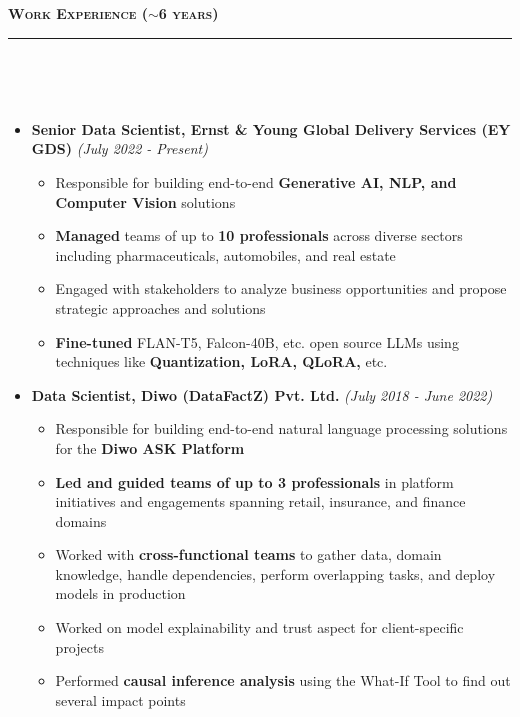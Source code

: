 \documentclass[a4paper,10pt]{article}
\newcommand{\isep}{-2 pt}
\newcommand{\lsep}{-0.5cm}
\newcommand{\resheading}[1]{{\small
        {
            \begin{minipage}
                {0.992\textwidth}\textbf{{\textsc{#1 \vphantom{p\^{E}} }}}
                \\[-0.3cm]
                \hrule
            \end{minipage}
            \\[-0.5cm]
        }
 }}
\begin{document}
\vspace{4pt}
\noindent
\resheading{\textbf{\large Work Experience ($\sim$6 years)}}\\[\lsep]
\vspace{4pt}
\begin{itemize}
    \item \textbf{Senior Data Scientist, Ernst \& Young Global Delivery Services (EY GDS)} \hfill {\emph{(July 2022 - Present)}}
    \\ [-0.6cm]
    \begin{itemize}\itemsep \isep
        \item Responsible for building end-to-end \textbf{Generative AI, NLP, and Computer Vision} solutions
        \item \textbf{Managed} teams of up to \textbf{10 professionals} across diverse sectors including pharmaceuticals, automobiles, and real estate
        \item Engaged with stakeholders to analyze business opportunities and propose strategic approaches and solutions
        \item \textbf{Fine-tuned} FLAN-T5, Falcon-40B, etc. open source LLMs using techniques like \textbf{Quantization, LoRA, QLoRA,} etc.
    \\ [-0.5cm]
    \end{itemize}
    
    \item \textbf{Data Scientist, Diwo (DataFactZ) Pvt. Ltd.} \hfill {\emph{(July 2018 - June 2022)}}
    \\ [-0.6cm]
    \begin{itemize}\itemsep \isep
        \item Responsible for building end-to-end natural language processing solutions for the \textbf{Diwo ASK Platform}
        \item \textbf{Led and guided teams of up to 3 professionals} in platform initiatives and engagements spanning retail, insurance, and finance domains
        \item Worked with \textbf{cross-functional teams} to gather data, domain knowledge, handle dependencies, perform overlapping tasks, and deploy models in production  
        \item Worked on model explainability and trust aspect for client-specific projects
        \item Performed \textbf{causal inference analysis} using the What-If Tool to find out several impact points
    \\ [-0.5cm]
    \end{itemize}
    

\end{itemize}
\end{document}
